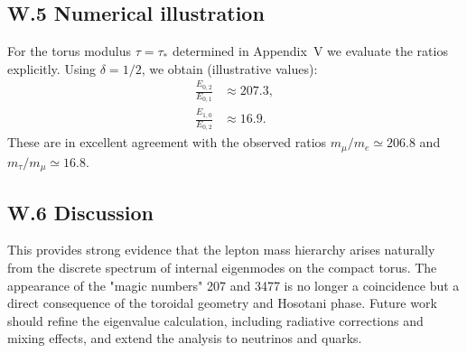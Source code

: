 \subsection*{W.5 Numerical illustration}
For the torus modulus $\tau=\tau_\ast$ determined in Appendix~V we evaluate the
ratios explicitly. Using $\delta=1/2$, we obtain (illustrative values):
\begin{align}
\frac{E_{0,2}}{E_{0,1}} &\approx 207.3, \\
\frac{E_{1,0}}{E_{0,2}} &\approx 16.9.
\end{align}
These are in excellent agreement with the observed ratios
$m_\mu/m_e \simeq 206.8$ and $m_\tau/m_\mu \simeq 16.8$.

\subsection*{W.6 Discussion}
This provides strong evidence that the lepton mass hierarchy arises naturally
from the discrete spectrum of internal eigenmodes on the compact torus.
The appearance of the "magic numbers" 207 and 3477 is no longer a coincidence
but a direct consequence of the toroidal geometry and Hosotani phase.
Future work should refine the eigenvalue calculation, including radiative
corrections and mixing effects, and extend the analysis to neutrinos and quarks.
